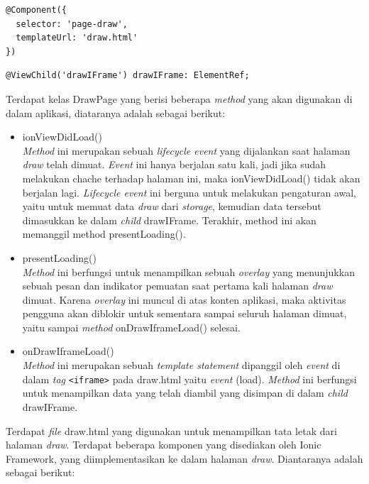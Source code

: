 \begin{enumerate}
\begin{enumerate}
\begin{lstlisting}[label={lst:componendraw}, caption=@Component pada draw.ts]
@Component({
  selector: 'page-draw',
  templateUrl: 'draw.html'
})
\end{lstlisting} 

\begin{lstlisting}[label={lst:viewchilddraw}, caption=@ViewChild pada draw.ts]
@ViewChild('drawIFrame') drawIFrame: ElementRef;
\end{lstlisting} 

	Terdapat kelas DrawPage yang berisi beberapa \textit{method} yang akan digunakan di dalam aplikasi, diataranya adalah sebagai berikut:
	
	\begin{itemize}
		\item ionViewDidLoad() \\
		\textit{Method} ini merupakan sebuah \textit{lifecycle event} yang dijalankan saat halaman \textit{draw} telah dimuat. \textit{Event} ini hanya berjalan satu kali, jadi jika sudah melakukan chache terhadap halaman ini, maka ionViewDidLoad() tidak akan berjalan lagi. \textit{Lifecycle event} ini berguna untuk melakukan pengaturan awal, yaitu untuk memuat data \textit{draw} dari \textit{storage}, kemudian data tersebut dimasukkan ke dalam \textit{child} drawIFrame. Terakhir, method ini akan memanggil method presentLoading().
		
		\item presentLoading() \\
		\textit{Method} ini berfungsi untuk menampilkan sebuah \textit{overlay} yang menunjukkan sebuah pesan dan indikator pemuatan saat pertama kali halaman \textit{draw} dimuat. Karena \textit{overlay} ini muncul di atas konten aplikasi, maka aktivitas pengguna akan diblokir untuk sementara sampai seluruh halaman dimuat, yaitu sampai \textit{method} onDrawIframeLoad() selesai.
		\item onDrawIframeLoad() \\
		\textit{Method} ini merupakan sebuah \textit{template statement} dipanggil oleh \textit{event} di dalam \textit{tag} \texttt{<iframe>} pada draw.html yaitu \textit{event} (load). \textit{Method} ini berfungsi untuk menampilkan data yang telah diambil yang disimpan di dalam \textit{child} drawIFrame.
	\end{itemize}
	
	Terdapat \textit{file} draw.html yang digunakan untuk menampilkan tata letak dari halaman \textit{draw}. Terdapat beberapa komponen yang disediakan oleh Ionic Framework, yang diimplementasikan ke dalam halaman \textit{draw}. Diantaranya adalah sebagai berikut:	
	

\end{enumerate}
\end{enumerate}
